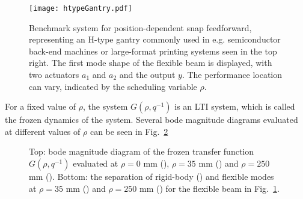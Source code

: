 \documentclass[letterpaper, 10 pt, conference]{ieeeconf}  %
\newcommand{\blueline}{\raisebox{2pt}{\tikz{\draw[-,matblue1,solid,line width = 0.9pt](0,0) -- (3mm,0);}}}
\newcommand{\redline}{\raisebox{2pt}{\tikz{\draw[-,matred1,dashed,line width = 0.9pt](0,0) -- (3mm,0);}}}
\newcommand{\yelline}{\raisebox{2pt}{\tikz{\draw[-,matyel1,dash dot,line width = 0.9pt](0,0) -- (3mm,0);}}}
\begin{document}
\begin{figure}[tbp]
	\centerline{\texttt{[image: htypeGantry.pdf]}}
	\caption{Benchmark system for position-dependent snap feedforward, representing an H-type gantry commonly used in e.g. semiconductor back-end machines or large-format printing systems seen in the top right. The first mode shape of the flexible beam is displayed, with two actuators $a_1$ and $a_2$ and the output $y$. The performance location can vary, indicated by the scheduling variable $\rho$.}
	\label{fig:beamFigure}
\end{figure}
For a fixed value of $\rho$, the system $G(\rho,q^{-1})$ is an LTI system, which is called the frozen dynamics of the system. Several bode magnitude diagrams evaluated at different values of $\rho$ can be seen in Fig.~\ref{fig:beamBodes}
\begin{figure}[tbp]
	\centering
	
	
	\caption{Top: bode magnitude diagram of the frozen transfer function $G(\rho,q^{-1})$ evaluated at $\rho=0$ mm (\protect\blueline), $\rho=35$ mm (\protect\redline) and $\rho=250$ mm (\protect\yelline). Bottom: the separation of rigid-body (\protect\blueline) and flexible modes at $\rho=35$ mm (\protect\redline) and $\rho=250$ mm (\protect\yelline) for the flexible beam in Fig.~\ref{fig:beamFigure}.}
	\label{fig:beamBodes}
\end{figure}
\end{document}
